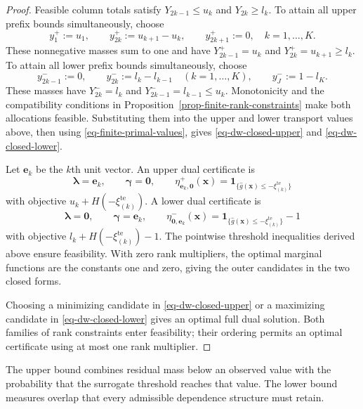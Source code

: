 \documentclass[review,11pt,3p,authoryear,nopreprintline]{elsarticle}
\begin{document}
\begin{proof}
  Feasible column totals satisfy $Y_{2k-1}\le u_k$ and $Y_{2k}\ge l_k$. To attain all upper prefix bounds simultaneously, choose
  \begin{equation*}
    y_1^+:=u_1,\qquad
    y_{2k}^+:=u_{k+1}-u_k,\qquad
    y_{2k+1}^+:=0,\quad k=1,\ldots,K.
  \end{equation*}
  These nonnegative masses sum to one and have
  $Y_{2k-1}^+=u_k$ and $Y_{2k}^+=u_{k+1}\ge l_k$.
  To attain all lower prefix bounds simultaneously, choose
  \begin{equation*}
    y_{2k-1}^-:=0,\qquad
    y_{2k}^-:=l_k-l_{k-1}\quad(k=1,\ldots,K),
    \qquad y_J^-:=1-l_K.
  \end{equation*}
  These masses have $Y_{2k}^-=l_k$ and
  $Y_{2k-1}^-=l_{k-1}\le u_k$.
  Monotonicity and the compatibility conditions in Proposition~\ref{prop-finite-rank-constraints} make both allocations feasible. Substituting them into the upper and lower transport values above, then using \eqref{eq-finite-primal-values}, gives \eqref{eq-dw-closed-upper} and \eqref{eq-dw-closed-lower}.

  Let $\bm e_k$ be the $k$th unit vector. An upper dual certificate is
\[
  \bm\lambda=\bm e_k,\qquad \bm\gamma=\bm 0,\qquad
  \eta^+_{\bm e_k,\bm 0}(\bm x)=\mathbf1_{\{\hat g(\bm x)\le-\xi_{(k)}^{\mathrm{te}}\}}
\]
with objective $u_k+H\left(-\xi_{(k)}^{\mathrm{te}}\right)$. A lower dual certificate is
\[
  \bm\lambda=\bm 0,\qquad \bm\gamma=\bm e_k,\qquad
  \eta^-_{\bm 0,\bm e_k}(\bm x)=\mathbf1_{\{\hat g(\bm x)\le-\xi_{(k)}^{\mathrm{te}}\}}-1
\]
with objective $l_k+H\left(-\xi_{(k)}^{\mathrm{te}}\right)-1$. The pointwise threshold inequalities derived above ensure feasibility. With zero rank multipliers, the optimal marginal functions are the constants one and zero, giving the outer candidates in the two closed forms.

Choosing a minimizing candidate in \eqref{eq-dw-closed-upper} or a maximizing candidate in \eqref{eq-dw-closed-lower} gives an optimal full dual solution. Both families of rank constraints enter feasibility; their ordering permits an optimal certificate using at most one rank multiplier.
\end{proof}

The upper bound combines residual mass below an observed value with the probability that the surrogate threshold reaches that value. The lower bound measures overlap that every admissible dependence structure must retain.
\end{document}
